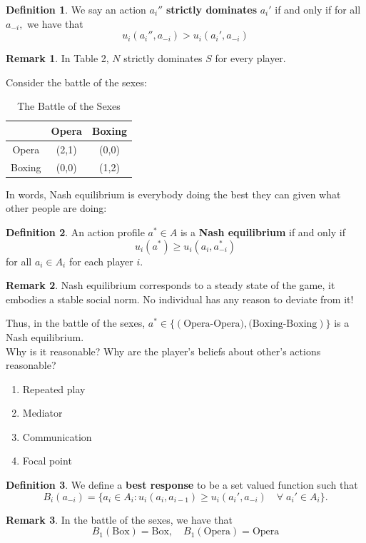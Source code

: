 \documentclass[10pt, oneside]{article}
\theoremstyle{definition}
\newtheorem{defn}{Definition}
\newtheorem{rem}{Remark}
\begin{document}
\begin{defn}
    We say an action $a_i''$ \textbf{strictly dominates} $a_i'$ if and only if for all $a_{-i},$ we have that 
    \[u_i(a_i'', a_{-i}) > u_i(a_i', a_{-i})\]
\end{defn}
\begin{rem}
    In Table 2, $N$ strictly dominates $S$ for every player.
\end{rem}
Consider the battle of the sexes:
 \begin{table}[H]
        \centering
        \begin{tabular}{c|c|c}
             & Opera & Boxing\\
             \hline
             Opera& (2,1) & (0,0) \\
             \hline
             Boxing&  (0,0)& (1,2)\\
        \end{tabular}
        \caption{The Battle of the Sexes}
    \end{table}
In words, Nash equilibrium is everybody doing the best they can given what other people are doing:
\begin{defn}
    An action profile $a^\ast \in A$ is a \textbf{Nash equilibrium} if and only if 
    \[u_i(a^\ast)\geq u_i(a_i, a_{-i}^\ast)\] for all $a_i \in A_i$ for each player $i.$
\end{defn}
\begin{rem}
    Nash equilibrium corresponds to a steady state of the game, it embodies a stable social norm. No individual has any reason to deviate from it!
\end{rem}
Thus, in the battle of the sexes, $a^\ast \in \{(\text{Opera-Opera)}, \text{(Boxing-Boxing})\}$ is a Nash equilibrium.\\
Why is it reasonable? Why are the player's beliefs about other's actions reasonable?
\begin{enumerate}
    \item Repeated play
    \item Mediator
    \item Communication
    \item Focal point
\end{enumerate}
\begin{defn}
    We define a \textbf{best response} to be a set valued function such that 
    \[B_i(a_{-i}) = \{a_i \in A_i : u_i(a_i, a_{i-1}) \geq u_i(a_i', a_{-i}) \quad \forall \; a_i' \in A_i\}.\]
\end{defn}
\begin{rem}
    In the battle of the sexes, we have that 
    \[B_1(\text{Box}) = \text{Box}, \quad B_1(\text{Opera}) = \text{Opera}\]
\end{rem}
\end{document}
